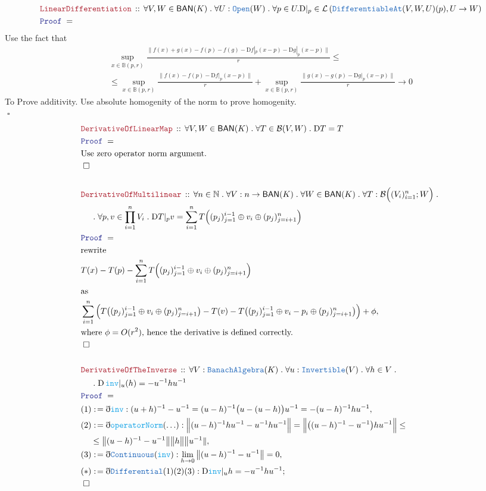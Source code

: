 \documentclass[12pt]{scrartcl}
\newcommand{\TYPE}[1]{\textcolor{NavyBlue}{\mathtt{#1}}}
\newcommand{\FUNC}[1]{\textcolor{Cerulean}{\mathtt{#1}}}
\newcommand{\LOGIC}[1]{\textcolor{Blue}{\mathtt{#1}}}
\newcommand{\THM}[1]{\textcolor{Maroon}{\mathtt{#1}}}
\renewcommand{\.}{\; . \;}
\newcommand{\de}{: \kern 0.1pc =}
\newcommand{\Theorem}[2]{& \THM{#1} \, :: \, #2 \\ & \Proof = \\ }
\newcommand{\NewLine}{\\ & \kern 1pc}
\newcommand{\Page}[1]{\begin{align*} #1 \end{align*}   }
\newcommand{ \bd }{ \ByDef }
\newcommand{\Nat}{\mathbb{N} }
\newcommand{\Say}[3]{& #1 \de #2 : #3, \\}
\newcommand{\Conclude}[3]{& #1 \de #2 : #3; \\}
\newcommand{\QED}{\; \square}
\newcommand{\EndProof}{& \QED \\}
\newcommand{\ByDef}{\eth}
\newcommand{\Proof}{\LOGIC{Proof} \; }
\newcommand{\Ball}{ \mathbb{B} }
\newcommand{\Lin}[1]{\mathcal{L}\left( #1 \right)}
\newcommand{\BAN}{\mathsf{BAN}} %
\newcommand{\D}{\mathrm{D}}
\newcommand{\B}{\mathcal{B}}
\begin{document}
\newpage
\Page{
	\Theorem{LinearDifferentiation}{ \forall V,W \in \BAN(K) \. \forall U : \TYPE{Open}(W) \.   
	\forall p \in U.
	\D |_p  \in \Lin{ \TYPE{DifferentiableAt}(V,W,U)(p) , U \to W }		
        }
}
Use the fact that
\begin{multline*}
	\sup_{x \in \Ball(p,r)} \frac{ \| f(x) + g(x) - f(p) - f(g) - \D f |_p ( x - p) - \D g |_p (x - p) \| }{r}
	\le \\ \le
	\sup_{x \in \Ball(p,r)} \frac{   \| f(x)  - f(p) - \D f |_p (x - p) \| }{r} 
	+
	\sup_{x \in \Ball(p,r)} \frac{  \| g(x) - g(p) - \D g |_p (x - p) \| }{r}
	\to
	0
\end{multline*}
To Prove additivity.
Use absolute homogenity of the norm to prove homogenity. \\
$\QED$
\Page{
	\Theorem{DerivativeOfLinearMap}{\forall V,W \in \BAN(K) \. \forall T \in \B(V,W) \.  \D T = T  }
	&  \textrm{Use zero operator norm argument.}  \\
	\EndProof
	\\
	\Theorem{DerivativeOfMultilinear}{ \forall n \in \Nat \. \forall V : n \to \BAN(K) \. \forall W \in \BAN(K)   
	 \. \forall T : \B\Big( (V_i)^n_{i=1} ; W \Big)  \. \NewLine \. \forall p,v \in \prod^n_{i=1} V_i \. 
	 \D T |_p v =  \sum^n_{i = 1} T\Big( ( p_j )^{i - 1}_{j = 1} \oplus  v_i \oplus ( p_j )^n_{j = i + 1}     \Big)
	}
	&  \textrm{rewrite} \\
	& T(x) - T(p) - \sum^n_{i = 1} T\Big( ( p_j )^{i - 1}_{j = 1} \oplus  v_i \oplus ( p_j )^n_{j = i + 1}     \Big) \\
	& \textrm{as} \\
	&  \sum^n_{i = 1}  \Big(   T\big( (p_j)^{i - 1}_{j = 1} \oplus v_i \oplus (p_j)^n_{j = i + 1} \big)
		- T(v) - T\big( (p_j)^{i - 1}_{j = 1} \oplus v_i - p_i  \oplus (p_j)^n_{j = i + 1} \big)
		\Big)
	    + \phi,  \\
	& \textrm{where $\phi = O(r^2)$, hence the derivative is defined correctly.} \\
	\EndProof
	\\
	\Theorem{DerivativeOfTheInverse}{ \forall V : \TYPE{BanachAlgebra}(K) \. \forall u : \TYPE{Invertible}(V) \. \forall h \in V \. 
	\NewLine \.
	\D \, 
	\FUNC{inv} |_u(h)  = -u^{-1}h u^{-1}}
	\Say{(1)}{\bd \FUNC{inv}}
	{  (u + h)^{-1} - u^{-1} = (u - h)^{-1}\big( u  -  (u -h) \big)u^{-1}  = 
	  - (u - h)^{-1}h u^{-1}
	}
	\Say{(2)}{ \bd \FUNC{operatorNorm}(\ldots)  }
	{
	  \Big\|  (u - h)^{-1}h u^{-1}   - u^{-1}h u^{-1}     \Big\| =
	  \Big\| \big( (u -h)^{-1} - u^{-1}\big) h u^{-1} \Big\| \le \NewLine \le
	  \big\|  (u - h)^{-1} - u^{-1}  \big\|\big\| h \big\|\big\| u^{-1} \|
	}
	\Say{(3)}{ \bd \TYPE{Continuous}(\FUNC{inv}) }{  \lim_{h \to 0} \big\| (u - h)^{-1} - u^{-1} \big\| = 0 }
	\Conclude{(*)}{\bd \TYPE{Differential}(1)(2)(3)}{ \D \FUNC{inv} |_{u} h = - u^{-1}h u^{-1} }
	\EndProof
}
\end{document}
